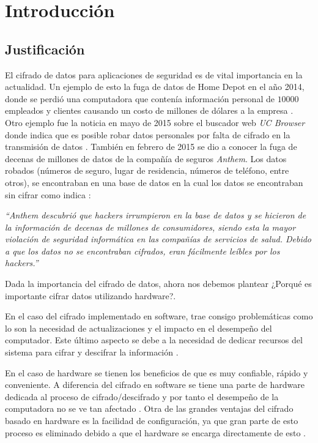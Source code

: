 \chapter{Introducción}
\section{Justificación}
El cifrado de datos para aplicaciones de seguridad es de vital importancia en la actualidad. Un ejemplo de esto la fuga de datos de Home Depot en el año 2014, donde se perdió una computadora que contenía información personal de $10000$ empleados y clientes causando un costo de millones de dólares a la empresa \citep{homeDepot}. Otro ejemplo fue la noticia en mayo de 2015 sobre el buscador web \textit{UC Browser} donde indica que es posible robar datos personales por falta de cifrado en la transmisión de datos \citep{ucBrowser}. También en febrero de 2015 se dio a conocer la fuga de decenas de millones de datos de la compañía de seguros \textit{Anthem}. Los datos robados (números de seguro, lugar de residencia, números de teléfono, entre otros), se encontraban en una base de datos en la cual los datos se encontraban sin cifrar como indica \cite{anthem}:
\begin{center}
    \begin{minipage}{0.9\linewidth}
        \vspace{5pt}%
        {\small
            \emph{``\textit{Anthem} descubrió que \textit{hackers} irrumpieron en la base de datos y se hicieron de la información de decenas de millones de consumidores, siendo esta la mayor violación de seguridad informática en las compañías de servicios de salud. Debido a que los datos no se encontraban cifrados, eran fácilmente leíbles por los \textit{hackers}.''}
        }
 		\vspace{5pt}%
    \end{minipage}
\end{center}
Dada la importancia del cifrado de datos, ahora nos debemos plantear ¿Porqué es importante cifrar datos utilizando hardware?.

En el caso del cifrado implementado en software, trae consigo problemáticas como lo son la necesidad de actualizaciones y el impacto en el desempeño del computador. Este último aspecto se debe a la necesidad de dedicar recursos del sistema para cifrar y descifrar la información \citep{apricorn}.

En el caso de hardware se tienen los beneficios de que es muy confiable, rápido y conveniente. A diferencia del cifrado en software se tiene una parte de hardware dedicada al proceso de cifrado/descifrado y por tanto el desempeño de la computadora no se ve tan afectado \citep{apricorn}. Otra de las grandes ventajas del cifrado basado en hardware es la facilidad de configuración, ya que gran parte de esto proceso es eliminado debido a que el hardware se encarga directamente de esto \citep{driveTrust}.

